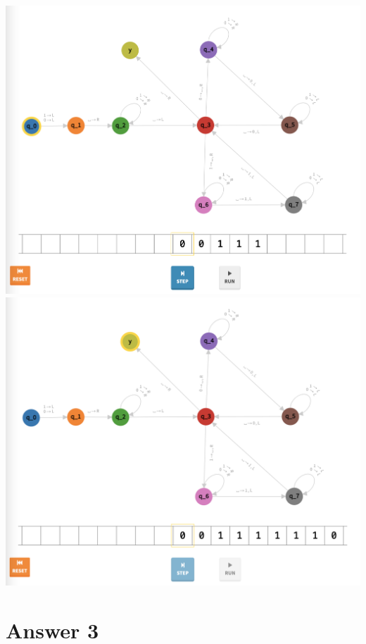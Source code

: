\documentclass[a4paper]{article}
\begin{document}
\begin{center}
\includegraphics[width=\textwidth]{TM2.13}
\includegraphics[width=\textwidth]{TM2.14}
\end{center}

\newpage

\section*{Answer 3}
\end{document}
